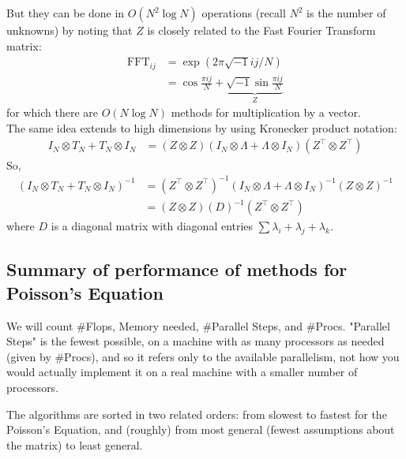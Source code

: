 \documentclass[11pt]{article}
\numberwithin{equation}{section}
\begin{document}
But they can be done in $O(N^2 \log N)$ operations (recall $N^2$ is the number of unknowns) by noting that $Z$ is closely related to the Fast Fourier Transform matrix: \begin{align*}
    \operatorname{FFT}_{ij} &= \exp \left( 2\pi \sqrt{-1} ij / N \right) \\
    &= \cos \frac{\pi ij}{N} + \underbrace{\sqrt{-1} \sin \frac{\pi ij}{N}}_Z
\end{align*}
for which there are $O(N\log N)$ methods for multiplication by a vector.\\
The same idea extends to high dimensions by using Kronecker product notation: \begin{align*}
    I_{N} \otimes T_{N} + T_{N} \otimes I_{N} &= (Z \otimes Z)\left(I_{N} \otimes \Lambda+\Lambda \otimes I_{N}\right)(Z^{\top} \otimes Z^{\top})
\end{align*}
So, \begin{align*}
    (I_{N} \otimes T_{N} + T_{N} \otimes I_{N})^{-1} &= (Z^{\top} \otimes Z^{\top})^{-1} (I_{N} \otimes \Lambda+\Lambda \otimes I_{N})^{-1} (Z \otimes Z)^{-1} \\
    &= (Z \otimes Z)\left( D \right)^{-1}(Z^{\top} \otimes Z^{\top})
\end{align*}
where $D$ is a diagonal matrix with diagonal entries $\sum \lambda_i + \lambda_j + \lambda_k$.

\subsection{Summary of performance of methods for Poisson's Equation}
We will count \#Flops, Memory needed, \#Parallel Steps, and \#Procs.
"Parallel Steps" is the fewest possible, on a machine with as many processors as needed (given by \#Procs), 
and so it refers only to the available parallelism, not how you would actually implement it on a real machine with a smaller number of processors.

The algorithms are sorted in two related orders: from slowest to fastest for the Poisson's Equation, and (roughly) from most general (fewest assumptions about the matrix) to least general.
\end{document}
